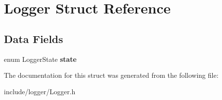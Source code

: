 \hypertarget{struct_logger}{}\section{Logger Struct Reference}
\label{struct_logger}
\subsection*{Data Fields}
\begin{DoxyCompactItemize}
\item 
\hypertarget{struct_logger_a3fb7893f6204638fe146909298361904}{}\label{struct_logger_a3fb7893f6204638fe146909298361904} 
enum Logger\+State {\bfseries state}
\end{DoxyCompactItemize}


The documentation for this struct was generated from the following file\+:\begin{DoxyCompactItemize}
\item 
include/logger/Logger.\+h\end{DoxyCompactItemize}
